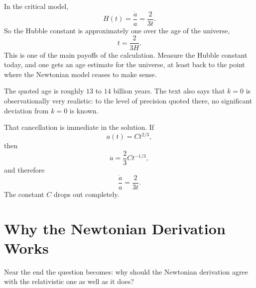 In the critical model,
\begin{equation}
H(t)=\frac{\dot a}{a}=\frac{2}{3t}.
\end{equation}
So the Hubble constant is approximately one over the age of the universe,
\begin{equation}
t=\frac{2}{3H}.
\end{equation}
This is one of the main payoffs of the calculation. Measure the Hubble constant today, and one gets an age estimate for the universe, at least back to the point where the Newtonian model ceases to make sense.

The quoted age is roughly \(13\) to \(14\) billion years. The text also says that \(k=0\) is observationally very realistic: to the level of precision quoted there, no significant deviation from \(k=0\) is known.

\begin{classroomqa}
\end{classroomqa}

That cancellation is immediate in the solution. If
\begin{equation}
a(t)=Ct^{2/3},
\end{equation}
then
\begin{equation}
\dot a=\frac{2}{3}Ct^{-1/3},
\end{equation}
and therefore
\begin{equation}
\frac{\dot a}{a}=\frac{2}{3t}.
\end{equation}
The constant \(C\) drops out completely.

\section{Why the Newtonian Derivation Works}

Near the end the question becomes: why should the Newtonian derivation agree with the relativistic one as well as it does?

